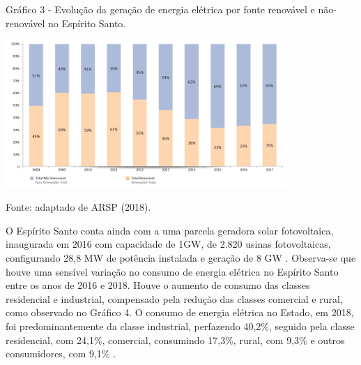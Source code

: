 \begin{onehalfspace}
        \begin{graph}
            \par \small Gráfico 3 - Evolução da geração de energia elétrica por fonte renovável e não-renovável no Espírito Santo.
            \begin{minipage}[ht]{1\textwidth}\centering
                \includegraphics[width=0.8\textwidth]{graphs/graph2_geracao_de_energia_eletrica_no_es-arsp_2018.png}
            \end{minipage}
            \begin{flushleft}
                \par \small Fonte: adaptado de ARSP (2018).
            \end{flushleft}
        \end{graph}

    \noindent O Espírito Santo conta ainda com a uma parcela geradora solar fotovoltaica, inaugurada em 2016 
    com capacidade de 1GW, de 2.820 usinas fotovoltaicas, configurando 28,8 MW de potência instalada 
    e geração de 8 GW \cite{AgenciadeRegulacaodeServicosPublicosdoEspiritoSanto-ARSP2018}.\vspace{0.3cm} \newline
    Observa-se que houve uma sensível variação no consumo de energia elétrica no Espírito Santo 
    entre os anos de 2016 e 2018. Houve o aumento de consumo das classes residencial e industrial, 
    compensado pela redução das classes comercial e rural, como observado no Gráfico 4. O consumo de 
    energia elétrica no Estado, em 2018, foi predominantemente da classe industrial, perfazendo 
    40,2\%, seguido pela classe residencial, com 24,1\%, comercial, consumindo 17,3\%, rural, 
    com 9,3\% e outros consumidores, com 9,1\% \cite{AgenciadeRegulacaodeServicosPublicosdoEspiritoSanto-ARSP2019}.
    

\end{onehalfspace}
